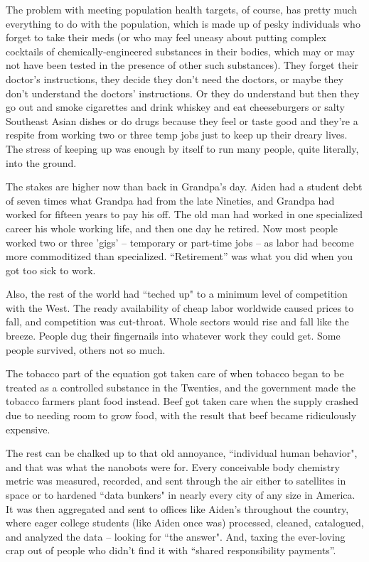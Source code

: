 \documentclass[11pt]{book}
\begin{document}
	The problem with meeting population health targets, of course, has pretty much everything to do with the population, which is made up of pesky individuals who forget to take their meds (or who may feel uneasy about putting complex cocktails of  chemically-engineered substances in their bodies, which may or may not have been tested in the presence of other such substances). They forget their doctor's instructions, they decide they don't need the doctors, or maybe they don't understand the doctors' instructions. Or they do understand but then they go out and smoke cigarettes and drink whiskey and eat cheeseburgers or salty Southeast Asian dishes or do drugs because they feel or taste good and they're a respite from working two or three temp jobs just to keep up their dreary lives. The stress of keeping up was enough by itself to run many people, quite literally, into the ground.
	
	The stakes are higher now than back in Grandpa's day. Aiden had a student debt of seven times what Grandpa had from the late Nineties, and Grandpa had worked for fifteen years to pay his off. The old man had worked in one specialized career his whole working life, and then one day he retired. Now most people worked two or three 'gigs' -- temporary or part-time jobs -- as labor had become more commoditized than specialized. ``Retirement'' was what you did when you got too sick to work. 
	
	Also, the rest of the world had ``teched up" to a minimum level of competition with the West. The ready availability of cheap labor worldwide caused prices to fall, and competition was cut-throat. Whole sectors would rise and fall like the breeze. People dug their fingernails into whatever work they could get. Some people survived, others not so much.
	
	The tobacco part of the equation got taken care of when tobacco began to be treated as a controlled substance in the Twenties, and the government made the tobacco farmers plant food instead. Beef got taken care when the supply crashed due to needing room to grow food, with the result that beef became ridiculously expensive. 
	
	The rest can be chalked up to that old annoyance, ``individual human behavior", and that was what the nanobots were for. Every conceivable body chemistry metric was measured, recorded, and sent through the air either to satellites in space or to hardened ``data bunkers" in nearly every city of any size in America. It was then aggregated and sent to offices like Aiden's throughout the country, where eager college students (like Aiden once was) processed, cleaned, catalogued, and analyzed the data -- looking for ``the answer". And, taxing the ever-loving crap out of people who didn't find it with ``shared responsibility payments''.
	
\end{document}
